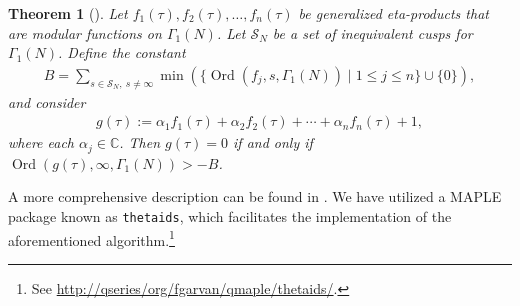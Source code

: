\documentclass[pdftex]{sigma}
\numberwithin{equation}{section}
\newtheorem{Theorem}{Theorem}[section]
\theoremstyle{definition}
\begin{document}
\begin{Theorem}[{\cite[Corollary 2.5]{FrGa19}}]\label{Thm-2.4}
Let $f_1(\tau), f_2(\tau), \dots, f_n(\tau)$ be generalized eta-products that are modular functions on $\Gamma_1(N)$. Let $\mathcal{S}_N$ be a set of inequivalent cusps for~$\Gamma_1(N)$. Define the constant
\begin{align}\label{B}
B=\sum_{s\in\mathcal{S}_N,~s\neq\infty}\min(\{\operatorname{Ord}(f_j,s,\Gamma_1(N)) \mid 1 \leq j\leq n\}\cup\{0\}),
\end{align}
and consider
\begin{align*}
g(\tau):=\alpha_1f_1(\tau)+\alpha_2f_2(\tau)+\cdots+\alpha_nf_n(\tau)+1,
\end{align*}
where each $\alpha_j\in\mathbb{C}$. Then
$g(\tau)=0$
if and only if
$\operatorname{Ord}(g(\tau),\infty,\Gamma_1(N)) > -B$.
\end{Theorem}
A more comprehensive description can be found in \cite{FrGa19}. We have utilized a MAPLE package known as \texttt{thetaids}, which facilitates the implementation of the aforementioned algorithm.\footnote{See
\url{http://qseries/org/fgarvan/qmaple/thetaids/}.}
\end{document}
